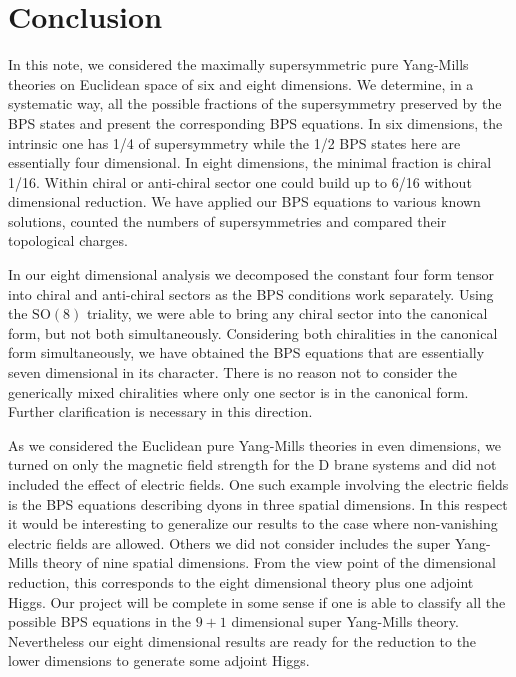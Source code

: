 \documentclass[a4paper,11pt]{article}
\begin{document}
\section{Conclusion\label{CONCLUSION}}

In  this note, we considered the maximally supersymmetric pure Yang-Mills theories on Euclidean space of six and eight dimensions. We determine, in
a systematic way,  all the possible fractions of the supersymmetry preserved by the BPS states and present the corresponding BPS equations. In six
dimensions, the intrinsic one has 1/4 of supersymmetry while the   1/2 BPS states here are essentially four dimensional. In eight dimensions, the
minimal fraction is chiral 1/16. Within chiral or anti-chiral sector one could build up to 6/16 without dimensional reduction. We have applied our
BPS equations to various known solutions, counted the numbers of supersymmetries and compared their topological charges.

In our eight dimensional analysis  we decomposed the constant four form tensor into chiral and anti-chiral sectors as the BPS conditions work
separately. Using the $\mbox{SO}(8)$ triality, we were able to bring any   chiral sector into the canonical form, but not both simultaneously.
Considering both chiralities in the canonical form simultaneously, we have obtained the BPS equations that are essentially seven dimensional in its
character. There is no reason not to consider the generically  mixed chiralities  where only one sector is in the canonical form. Further
clarification is necessary in this direction.


As we considered  the Euclidean pure Yang-Mills theories in even dimensions, we turned on only the magnetic field
strength for the D brane systems and  did not included the effect of electric fields. One such example involving the
electric fields  is the BPS equations describing dyons in three spatial dimensions.  In this respect it would be
interesting to generalize our results to the case where non-vanishing electric fields are allowed. Others we did not
consider includes  the super Yang-Mills theory of nine spatial dimensions.  From the view point of the dimensional
reduction, this corresponds to the eight dimensional theory plus one adjoint Higgs. Our project will be complete  in some
sense if one is able to classify all the possible  BPS equations in  the $9+1$ dimensional super Yang-Mills theory.
Nevertheless our eight dimensional results are ready for the reduction to the lower dimensions to generate some adjoint
Higgs.\\
\end{document}
